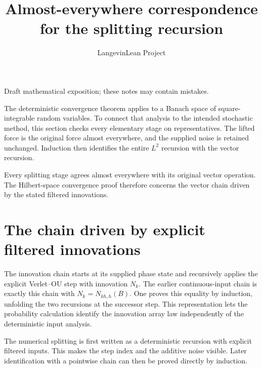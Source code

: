\documentclass[11pt,a4paper]{article}
\title{\texorpdfstring{Almost-everywhere correspondence for the splitting recursion}{Almost-everywhere correspondence for the splitting recursion}}
\author{LangevinLean Project}
\date{}
\begin{document}
\maketitle
Draft mathematical exposition; these notes may contain mistakes.


The deterministic convergence theorem applies to a Banach space of square-integrable random variables. To connect that analysis to the intended stochastic method, this section checks every elementary stage on representatives. The lifted force is the original force almost everywhere, and the supplied noise is retained unchanged. Induction then identifies the entire \(L^{2}\) recursion with the vector recursion.



Every splitting stage agrees almost everywhere with its original vector operation. The Hilbert-space convergence proof therefore concerns the vector chain driven by the stated filtered innovations.


\section{\texorpdfstring{The chain driven by explicit filtered innovations}{The chain driven by explicit filtered innovations}}


The innovation chain starts at its supplied phase state and recursively applies the explicit Verlet–OU step with innovation \(N_k\). The earlier continuous-input chain is exactly this chain with \(N_k=N_{kh,h}(B)\). One proves this equality by induction, unfolding the two recursions at the successor step. This representation lets the probability calculation identify the innovation array law independently of the deterministic input analysis.



The numerical splitting is first written as a deterministic recursion with explicit filtered inputs. This makes the step index and the additive noise visible. Later identification with a pointwise chain can then be proved directly by induction.
\end{document}
